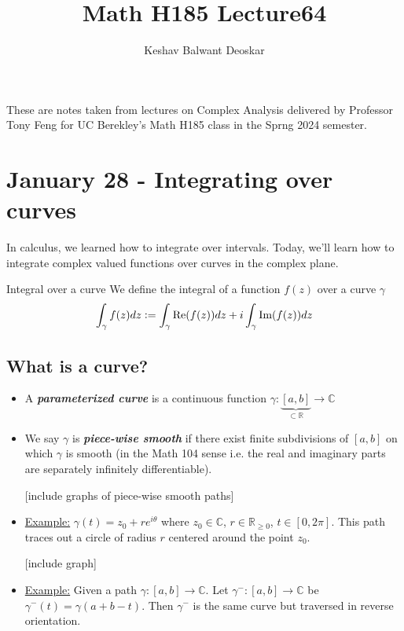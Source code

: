 \documentclass{article}
\title{Math H185 Lecture64}
\author{Keshav Balwant Deoskar}
\newcommand{\R}{\mathbb{R}}
\newcommand{\C}{\mathbb{C}}
\newcommand{\defeq}{\vcentcolon=}
\begin{document}
\maketitle

These are notes taken from lectures on Complex Analysis delivered by Professor Tony Feng for UC Berekley's Math H185 class in the Sprng 2024 semester.

\tableofcontents

\pagebreak

\section{January 28 - Integrating over curves}

\vskip 0.5cm
In calculus, we learned how to integrate over intervals. Today, we'll learn how to integrate complex valued functions over curves in the complex plane.

\vskip 0.5cm
\begin{mathdefinitionbox}{Integral over a curve}
  \vskip 0.5cm
  We define the integral of a function $f(z)$ over a curve $\gamma$
  \[ \int_{\gamma} f(z) dz \defeq \int_{\gamma} \text{Re}(f(z))dz + i \int_{\gamma} \text{Im}(f(z))dz \]
\end{mathdefinitionbox}


\vskip 0.5cm
\subsection{What is a curve?}
\begin{itemize}
  \item A \textbf{\emph{parameterized curve}} is a continuous function $\gamma : \underbrace{[a, b]}_{\subset \R} \rightarrow \C$

  \item We say $\gamma$ is \textbf{\emph{piece-wise smooth}} if there exist finite subdivisions of $[a, b]$ on which $\gamma$ is smooth (in the Math 104 sense i.e. the real and imaginary parts are separately infinitely differentiable).
  
  [include graphs of piece-wise smooth paths]

  \item \underline{Example:} $\gamma(t) = z_0 + re^{i\theta}$ where $z_0 \in \C$, $r \in \R_{\geq 0}$, $t \in [0, 2\pi]$. This path traces out a circle of radius $r$ centered around the point $z_0$.
  
  [include graph]

  \item \underline{Example:} Given a path $\gamma : [a, b] \rightarrow \C$. Let $\gamma^{-} : [a, b] \rightarrow \C$ be $\gamma^{-}(t) = \gamma(a + b - t)$. Then $\gamma^{-}$ is the same curve but traversed in reverse orientation.
\end{itemize}
\end{document}
